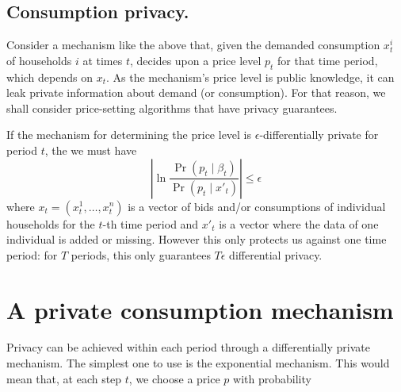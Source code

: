 \documentclass[a4paper,onecolumn]{article}
\numberwithin{algorithm}{section}
\theoremstyle{plain}
\theoremstyle{definition}
\theoremstyle{example}
\newcommand{\demand}{x}
\newcommand{\fdemand}{\beta}
\newcommand{\price}{p}
\newcommand{\cost}{J}
\begin{document}
\subsection{Consumption privacy.}

Consider a mechanism like the above that, given the demanded consumption
$\demand_t^i$ of households $i$ at times $t$, decides upon a price
level $\price_{t}$ for that time period, which depends on
$\demand_{t}$. As the mechanism's price level is public knowledge, it
can leak private information about demand (or consumption). For that
reason, we shall consider price-setting algorithms that have privacy
guarantees.

If the mechanism for determining the price level is
$\epsilon$-differentially private for period $t$, the we must have
\[
\left|
  \ln \frac{\Pr(\price_t \mid \fdemand_t)}{\Pr(\price_t \mid x'_t)}
\right|
 \leq \epsilon
\]
where $\demand_t = (\demand^1_t, \ldots, \demand^n_t)$ is a vector of
bids and/or consumptions of individual households for the $t$-th time
period and $x'_t$ is a vector where the data of one individual is
added or missing.  However this only protects us against one time
period: for $T$ periods, this only guarantees $T \epsilon$
differential privacy.

\section{A private consumption mechanism}

Privacy can be achieved within each period through a differentially
private mechanism. The simplest one to use is the exponential
mechanism. This would mean that, at each step $t$, we choose a price $p$ with probability




\end{document}
